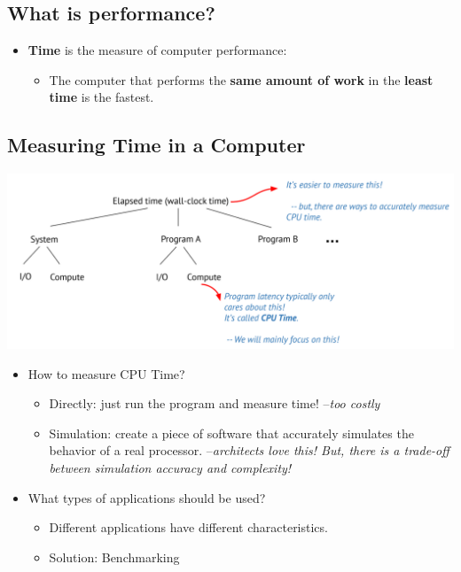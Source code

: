 \documentclass[10pt]{article}
\begin{document}
\subsection*{What is performance?}
\begin{itemize}
    \item \textbf{Time} is the measure of computer performance:
    \begin{itemize}
        \item The computer that performs the \textbf{same amount of work} in the \textbf{least time} is the fastest.
    \end{itemize}
\end{itemize}

\subsection*{Measuring Time in a Computer}
\begin{center}
    \includegraphics*[scale=0.6]{W2_14.png}
\end{center}
\begin{itemize}
    \item How to measure CPU Time?
    \begin{itemize}
        \item Directly: just run the program and measure time!  --\textit{too costly}
        \item Simulation: create a piece of software that accurately simulates the behavior of a real processor.  --\textit{architects love this!  But, there is a trade-off between simulation accuracy and complexity!}
    \end{itemize}
    \item What types of applications should be used?
    \begin{itemize}
        \item Different applications have different characteristics.
        \item Solution: Benchmarking
    \end{itemize}
\end{itemize}
\end{document}
